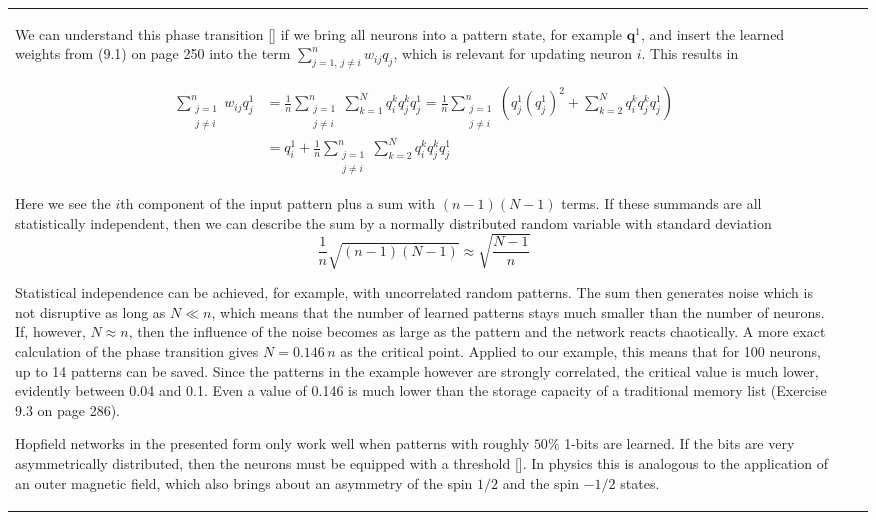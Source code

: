 \documentclass[10pt]{book}
\begin{document}
\begin{center}
\begin{tabular}{|l|l|l|}
We can understand this phase transition [\cite{rms92}] if we bring all neurons into a pattern state, for example $\boldsymbol{q}^{1}$, and insert the learned weights from (9.1) on page 250 into the term $\sum_{j=1,\, j \neq i}^{n} w_{ij} q_{j}$, which is relevant for updating neuron $i$. This results in

$$
\begin{aligned}
\sum_{\substack{j=1 \\ j \neq i}}^{n} w_{ij} q_{j}^{1} & = \frac{1}{n} \sum_{\substack{j=1 \\ j \neq i}}^{n} \sum_{k=1}^{N} q_{i}^{k} q_{j}^{k} q_{j}^{1}
= \frac{1}{n} \sum_{\substack{j=1 \\ j \neq i}}^{n} \left( q_{j}^{1} \left(q_{j}^{1}\right)^{2} + \sum_{k=2}^{N} q_{i}^{k} q_{j}^{k} q_{j}^{1} \right) \\
&= q_{i}^{1} + \frac{1}{n} \sum_{\substack{j=1 \\ j \neq i}}^{n} \sum_{k=2}^{N} q_{i}^{k} q_{j}^{k} q_{j}^{1}
\end{aligned}
$$

Here we see the $i$th component of the input pattern plus a sum with $(n-1)(N-1)$ terms. If these summands are all statistically independent, then we can describe the sum by a normally distributed random variable with standard deviation
$$
\frac{1}{n} \sqrt{(n-1)(N-1)} \approx \sqrt{\frac{N-1}{n}}
$$

Statistical independence can be achieved, for example, with uncorrelated random patterns. The sum then generates noise which is not disruptive as long as $N \ll n$, which means that the number of learned patterns stays much smaller than the number of neurons. If, however, $N \approx n$, then the influence of the noise becomes as large as the pattern and the network reacts chaotically. A more exact calculation of the phase transition gives $N=0.146\,n$ as the critical point. Applied to our example, this means that for 100 neurons, up to 14 patterns can be saved. Since the patterns in the example however are strongly correlated, the critical value is much lower, evidently between 0.04 and 0.1. Even a value of 0.146 is much lower than the storage capacity of a traditional memory list (Exercise 9.3 on page 286).

Hopfield networks in the presented form only work well when patterns with roughly $50\%$ 1-bits are learned. If the bits are very asymmetrically distributed, then the neurons must be equipped with a threshold [\cite{roj96}]. In physics this is analogous to the application of an outer magnetic field, which also brings about an asymmetry of the spin $1/2$ and the spin $-1/2$ states.


\end{tabular}
\end{center}
\end{document}
